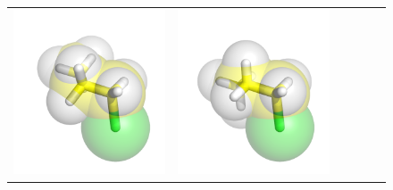 \documentclass{svmult}
\begin{document}
\begin{figure}
\begin{tabular}{cccccc}
\includegraphics[width=\tmpa]{fig/m003-008} & 
\includegraphics[width=\tmpa]{fig/m003-009} & 

\end{tabular}
\end{figure}
\end{document}
